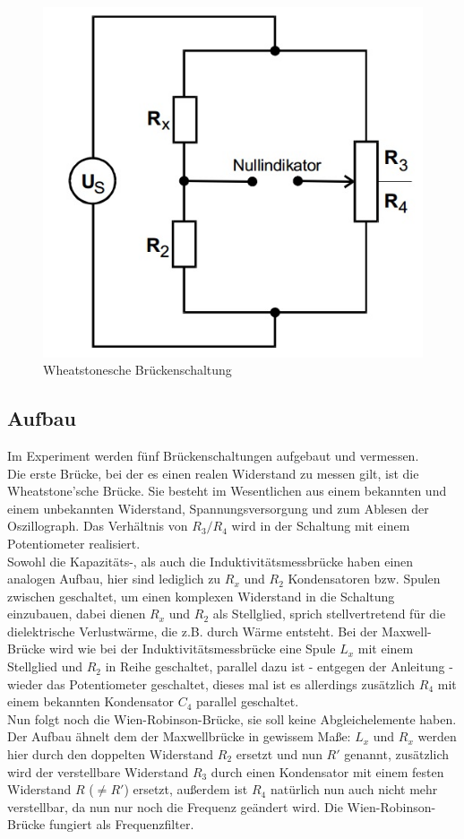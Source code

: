 \begin{figure}
       \includegraphics[scale=0.5]{Grafiken/Wheat}
       \caption{Wheatstonesche Brückenschaltung}
       \label{fig:Wheat}
\end{figure}
\subsection{Aufbau}
Im Experiment werden fünf Brückenschaltungen aufgebaut und vermessen. \\
Die erste Brücke, bei der es einen realen Widerstand zu messen gilt, ist die Wheatstone'sche Brücke. Sie besteht im Wesentlichen aus einem bekannten und einem unbekannten Widerstand, Spannungsversorgung und zum Ablesen der Oszillograph. Das Verhältnis von $R_3/R_4$ wird in der Schaltung mit einem Potentiometer realisiert.\\
Sowohl die Kapazitäts-, als auch die Induktivitätsmessbrücke haben einen analogen Aufbau, hier sind lediglich zu $R_x$ und $R_2$ Kondensatoren bzw. Spulen zwischen geschaltet, um einen komplexen Widerstand in die Schaltung einzubauen, dabei dienen $R_x$ und $R_2$ als Stellglied, sprich stellvertretend für die dielektrische Verlustwärme, die z.B. durch Wärme entsteht.
Bei der Maxwell-Brücke wird wie bei der Induktivitätsmessbrücke eine Spule $L_x$ mit einem Stellglied und $R_2$ in Reihe geschaltet, parallel dazu ist - entgegen der Anleitung - wieder das Potentiometer geschaltet, dieses mal ist es allerdings zusätzlich $R_4$ mit einem bekannten Kondensator $C_4$ parallel geschaltet.\\
Nun folgt noch die Wien-Robinson-Brücke, sie soll keine Abgleichelemente haben.
Der Aufbau ähnelt dem der Maxwellbrücke in gewissem Maße: $L_x$ und $R_x$ werden hier durch den doppelten Widerstand $R_2$ ersetzt und nun $R'$ genannt, zusätzlich wird der verstellbare Widerstand $R_3$ durch einen Kondensator mit einem festen Widerstand $R$ ($\neq R'$) ersetzt, außerdem ist $R_4$ natürlich nun auch nicht mehr verstellbar, da nun nur noch die Frequenz geändert wird.
Die Wien-Robinson-Brücke fungiert als Frequenzfilter. \\
